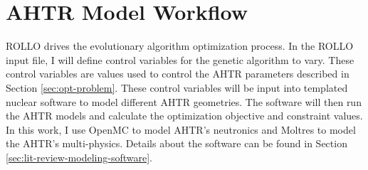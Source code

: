 \section{AHTR Model Workflow}
\gls{ROLLO} drives the evolutionary algorithm optimization process. 
In the \gls{ROLLO} input file, I will define control variables for the genetic algorithm 
to vary. 
These control variables are values used to control the \gls{AHTR} parameters described in 
Section \ref{sec:opt-problem}.
These control variables will be input into templated nuclear software to model different 
AHTR geometries.
The software will then run the \gls{AHTR} models and calculate the optimization objective 
and constraint values. 
In this work, I use OpenMC \cite{romano_openmc:_2015} to model \gls{AHTR}'s neutronics 
and Moltres \cite{lindsay_introduction_2018} to model the \gls{AHTR}'s multi-physics. 
Details about the software can be found in Section \ref{sec:lit-review-modeling-software}.

